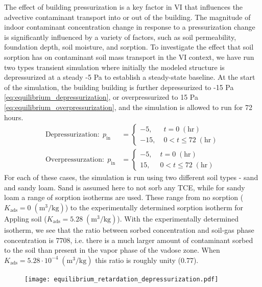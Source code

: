 The effect of building pressurization is a key factor in VI that influences the advective contaminant transport into or out of the building.
The magnitude of indoor contaminant concentration change in response to a pressurization change is significantly influenced by a variety of factors, such as soil permeability, foundation depth, soil moisture, and sorption.
To investigate the effect that soil sorption has on contaminant soil mass transport in the VI context, we have run two types transient simulation where initially the modeled structure is depressurized at a steady -5 Pa to establish a steady-state baseline.
At the start of the simulation, the building building is further depressurized to -15 Pa \eqref{eq:equilibrium_depressurization}, or overpressurized to 15 Pa \eqref{eq:equilibrium_overpressurization}, and the simulation is allowed to run for 72 hours.
\begin{align}
  \text{Depressurization}: \; p_\mathrm{in} &= \begin{cases}
    -5, \; &t = 0 \; \mathrm{(hr)} \\
    -15, \; &0 < t \leq 72 \; \mathrm{(hr)}
\end{cases}\label{eq:equilibrium_depressurization}\\
\text{Overpressurzation}: \; p_\mathrm{in} &= \begin{cases}
  -5, \; &t = 0 \; \mathrm{(hr)} \\
  15, \; &0 < t \leq 72 \; \mathrm{(hr)}
\end{cases}\label{eq:equilibrium_overpressurization}
\end{align}
For each of these cases, the simulation is run using two different soil types - sand and sandy loam.
Sand is assumed here to not sorb any TCE, while for sandy loam a range of sorption isotherms are used.
These range from no sorption ($K_\mathrm{ads} = 0 \; \mathrm{(m^3/kg)}$) to the experimentally determined sorption isotherm for Appling soil ($K_\mathrm{ads} = 5.28 \; \mathrm{(m^3/kg)}$).
With the experimentally determined isotherm, we see that the ratio between sorbed concentration and soil-gas phase concentration is 7708, i.e. there is a much larger amount of contaminant sorbed to the soil than present in the vapor phase of the vadose zone.
When $K_\mathrm{ads} = 5.28 \cdot 10^{-4} \; \mathrm{(m^3/kg)}$ this ratio is roughly unity (0.77).\par

\begin{figure}[!htb]
  \texttt{[image: equilibrium\_retardation\_depressurization.pdf]}
  \caption{}
  \label{fig:equilibrium_depressurization}
\end{figure}

